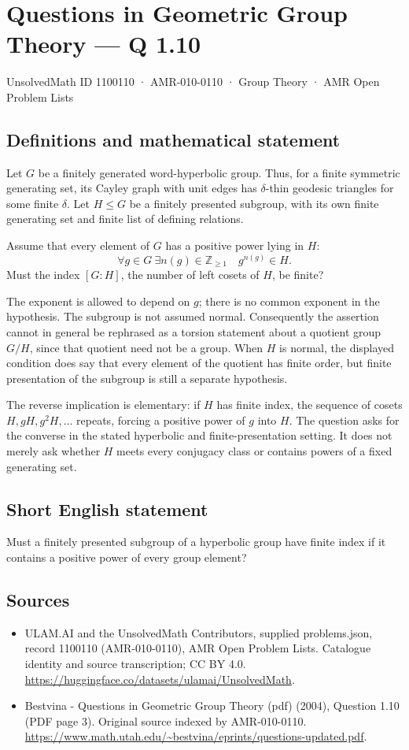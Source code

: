 \documentclass[11pt,a4paper]{article}
\begin{document}
\section*{Questions in Geometric Group Theory — Q 1.10}\label{1100110}
{\small UnsolvedMath ID 1100110 · AMR-010-0110 · Group Theory · AMR Open Problem Lists}
\subsection{Definitions and mathematical statement}
Let $G$ be a finitely generated word-hyperbolic group. Thus, for a finite symmetric generating set, its Cayley graph with unit edges has $\delta$-thin geodesic triangles for some finite $\delta$. Let $H\leq G$ be a finitely presented subgroup, with its own finite generating set and finite list of defining relations.

Assume that every element of $G$ has a positive power lying in $H$:
\[
 \forall g\in G\ \exists n(g)\in\mathbb Z_{\geq1}
          \quad g^{n(g)}\in H.
\]
Must the index $[G:H]$, the number of left cosets of $H$, be finite?

The exponent is allowed to depend on $g$; there is no common exponent in the hypothesis. The subgroup is not assumed normal. Consequently the assertion cannot in general be rephrased as a torsion statement about a quotient group $G/H$, since that quotient need not be a group. When $H$ is normal, the displayed condition does say that every element of the quotient has finite order, but finite presentation of the subgroup is still a separate hypothesis.

The reverse implication is elementary: if $H$ has finite index, the sequence of cosets $H,gH,g^2H,\ldots$ repeats, forcing a positive power of $g$ into $H$. The question asks for the converse in the stated hyperbolic and finite-presentation setting. It does not merely ask whether $H$ meets every conjugacy class or contains powers of a fixed generating set.
\subsection{Short English statement}
Must a finitely presented subgroup of a hyperbolic group have finite index if it contains a positive power of every group element?
\subsection{Sources}
\begin{itemize}
\item[S1] ULAM.AI and the UnsolvedMath Contributors, supplied problems.json, record 1100110 (AMR-010-0110), AMR Open Problem Lists. Catalogue identity and source transcription; CC BY 4.0.
\url{https://huggingface.co/datasets/ulamai/UnsolvedMath}.
\item[S2] Bestvina - Questions in Geometric Group Theory (pdf) (2004), Question 1.10 (PDF page 3). Original source indexed by AMR-010-0110.
\url{https://www.math.utah.edu/~bestvina/eprints/questions-updated.pdf}.
\end{itemize}
\end{document}
